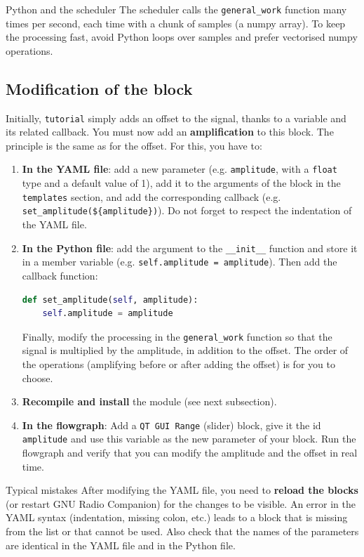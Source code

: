 \begin{bclogo}[couleur = gray!20, arrondi = 0.2, logo=\bcinfo]{Python and the scheduler}
The scheduler calls the \texttt{general\_work} function many times per second, each time with a chunk of samples (a numpy array). To keep the processing fast, avoid Python loops over samples and prefer vectorised numpy operations.
\end{bclogo}

\subsection{Modification of the block}

Initially, \texttt{tutorial} simply adds an offset to the signal, thanks to a variable and its related callback. You must now add an \textbf{amplification} to this block. The principle is the same as for the offset. For this, you have to:
\begin{enumerate}
    \item \textbf{In the YAML file}: add a new parameter (e.g. \texttt{amplitude}, with a \texttt{float} type and a default value of 1), add it to the arguments of the block in the \texttt{templates} section, and add the corresponding callback (e.g. \texttt{set\_amplitude(\$\{amplitude\})}). Do not forget to respect the indentation of the YAML file.
    \item \textbf{In the Python file}: add the argument to the \texttt{\_\_init\_\_} function and store it in a member variable (e.g. \texttt{self.amplitude = amplitude}). Then add the callback function:
\begin{lstlisting}[language=Python]
def set_amplitude(self, amplitude):
    self.amplitude = amplitude
\end{lstlisting}
    Finally, modify the processing in the \texttt{general\_work} function so that the signal is multiplied by the amplitude, in addition to the offset. The order of the operations (amplifying before or after adding the offset) is for you to choose.
    \item \textbf{Recompile and install} the module (see next subsection).
    \item \textbf{In the flowgraph}: Add a \texttt{QT GUI Range} (slider) block, give it the id \texttt{amplitude} and use this variable as the new parameter of your block. Run the flowgraph and verify that you can modify the amplitude and the offset in real time.
\end{enumerate}

\begin{bclogo}[couleur = gray!20, arrondi = 0.2, logo=\bcattention]{Typical mistakes}
After modifying the YAML file, you need to \textbf{reload the blocks} (or restart GNU Radio Companion) for the changes to be visible. An error in the YAML syntax (indentation, missing colon, etc.) leads to a block that is missing from the list or that cannot be used. Also check that the names of the parameters are identical in the YAML file and in the Python file.
\end{bclogo}

